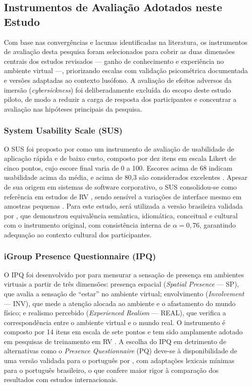 \subsection{Instrumentos de Avaliação Adotados neste Estudo}

Com base nas convergências e lacunas identificadas na literatura, os instrumentos de avaliação desta pesquisa foram selecionados para cobrir as duas dimensões centrais dos estudos revisados — ganho de conhecimento e experiência no ambiente virtual —, priorizando escalas com validação psicométrica documentada e versões adaptadas ao contexto lusófono. A avaliação de efeitos adversos da imersão (\textit{cybersickness}) foi deliberadamente excluída do escopo deste estudo piloto, de modo a reduzir a carga de resposta dos participantes e concentrar a avaliação nas hipóteses principais da pesquisa.

\subsubsection{System Usability Scale (SUS)}

O \gls{SUS} foi proposto por  como um instrumento de avaliação de usabilidade de aplicação rápida e de baixo custo, composto por dez itens em escala Likert de cinco pontos, cujo escore final varia de 0 a 100. Escores acima de 68 indicam usabilidade acima da média, e acima de 80,3 são considerados excelentes \cite{brooke2013}. Apesar de sua origem em sistemas de software corporativo, o SUS consolidou-se como referência em estudos de RV \cite{joshi2021}, sendo sensível a variações de interface mesmo em amostras pequenas \cite{brooke2013}. Para este estudo, será utilizada a versão brasileira validada por , que demonstrou equivalência semântica, idiomática, conceitual e cultural com o instrumento original, com consistência interna de $\alpha = 0{,}76$, garantindo adequação ao contexto cultural dos participantes.

\subsubsection{iGroup Presence Questionnaire (IPQ)}

O \gls{IPQ} foi desenvolvido por  para mensurar a sensação de presença em ambientes virtuais a partir de três dimensões: presença espacial (\textit{Spatial Presence} — SP), que avalia a sensação de ``estar'' no ambiente virtual; envolvimento (\textit{Involvement} — INV), que mede a atenção alocada ao ambiente e o afastamento do mundo físico; e realismo percebido (\textit{Experienced Realism} — REAL), que verifica a correspondência entre o ambiente virtual e o mundo real. O instrumento é composto por 14 itens em escala de sete pontos e tem sido amplamente adotado em pesquisas de treinamento em RV \cite{nykanen2020}. A escolha do IPQ em detrimento de alternativas como o \textit{Presence Questionnaire} (PQ) deve-se à disponibilidade de uma versão validada para o português por , com adaptações lexicais mínimas para o português brasileiro, o que confere maior rigor à comparação dos resultados com estudos internacionais.

